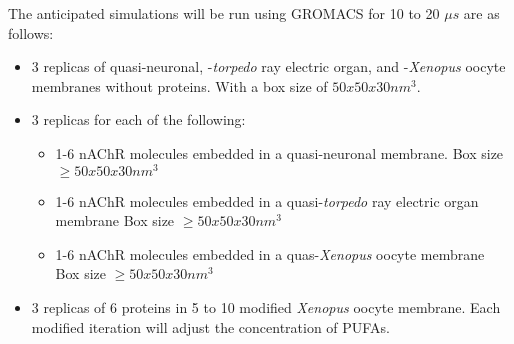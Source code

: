 \documentclass{article}
\begin{document}
The anticipated simulations will be run using GROMACS for 10 to 20 $\mu s$ are as follows:

\begin{itemize}

	\item  3 replicas of quasi-neuronal, -\textit{torpedo} ray electric organ, and -\textit{Xenopus} oocyte membranes without proteins. With a box size of $50x50x30$$nm^3$. 
	
	\item 3 replicas for each of the following:
	\begin{itemize}
		\item 1-6 nAChR molecules embedded in a quasi-neuronal membrane. Box size $\geq$$50x50x30$$nm^3$
		\item 1-6 nAChR molecules embedded in a quasi-\textit{torpedo} ray electric organ membrane Box size $\geq$$50x50x30$$nm^3$
		\item 1-6 nAChR molecules embedded in a quas-\textit{Xenopus} oocyte membrane Box size $\geq$$50x50x30$$nm^3$
	\end{itemize}
	\item 3 replicas of 6 proteins in 5 to 10 modified \textit{Xenopus} oocyte membrane. Each modified iteration will adjust the concentration of PUFAs.

\end{itemize} 



\end{document}
